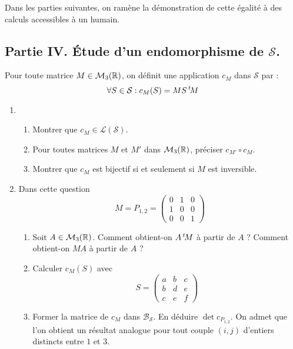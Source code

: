 Dans les parties suivantes, on ramène la démonstration de cette égalité à des calculs accessibles à un humain.

\subsection*{Partie IV. \'Etude d'un endomorphisme de $\mathcal S$.}
Pour toute matrice $M\in\mathcal M_3(\mathbb{R})$, on définit une application $c_M$ dans $\mathcal S$ par :
\begin{displaymath}
 \forall S\in \mathcal S : c_M(S) = M S \,\mathstrut^t\! M
\end{displaymath}
\begin{enumerate}
 \item \begin{enumerate}
 \item Montrer que $c_M\in \mathcal L(\mathcal S)$.
\item Pour toutes matrices $M$ et $M'$ dans $\mathcal M_3(\mathbb{R})$, préciser $c_{M'} \circ c_M$.
\item Montrer que $c_M$ est bijectif si et seulement si $M$ est inversible. 
\end{enumerate}
\item Dans cette question 
\begin{displaymath}
 M = P_{1,2}=
\begin{pmatrix}
 0 & 1 & 0 \\ 1 & 0 & 0 \\ 0 & 0 & 1 
\end{pmatrix}
\end{displaymath}
\begin{enumerate}
 \item Soit $A\in \mathcal M_3(\mathbb{R})$. Comment obtient-on $A\,\mathstrut^t\! M$ à partir de $A$ ? Comment obtient-on $MA$ à partir de $A$ ?
\item Calculer $c_M(S)$ avec 
\begin{displaymath}
 S =
\begin{pmatrix}
 a & b & c \\ b & d & e \\ c & e & f
\end{pmatrix}
\end{displaymath}
\item Former la matrice de $c_M$ dans $\mathcal B_{\mathcal S}$. En déduire $\det c_{P_{1,2}}$.
\newline
On admet que l'on obtient un résultat analogue pour tout couple $(i,j)$ d'entiers distincts entre $1$ et $3$.
\end{enumerate}


\end{enumerate}
